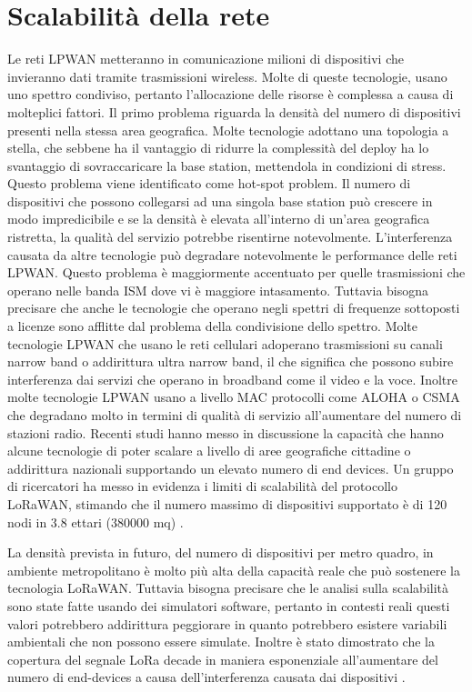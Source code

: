 \documentclass[12pt,a4paper,openright,twoside]{report}
\begin{document}
\section{Scalabilit\`a della rete}
Le reti LPWAN metteranno in comunicazione milioni di dispositivi che invieranno dati tramite trasmissioni wireless. Molte di queste tecnologie, usano uno spettro condiviso, pertanto l'allocazione delle risorse \`e complessa a causa di molteplici fattori. 
Il primo problema riguarda la densit\`a del numero di dispositivi presenti nella stessa area geografica. Molte tecnologie adottano una topologia a stella, che sebbene ha il vantaggio di ridurre la complessit\`a del deploy ha lo svantaggio di sovraccaricare la base station, mettendola in condizioni di stress. 
Questo problema viene identificato come hot-spot problem. Il numero di dispositivi che possono collegarsi ad una singola base station pu\`o crescere in modo impredicibile e se la densit\`a \`e elevata all'interno di un'area geografica ristretta, la qualit\`a del servizio potrebbe risentirne notevolmente.  
L'interferenza causata da altre tecnologie pu\`o degradare notevolmente le performance delle reti LPWAN. Questo problema \`e maggiormente accentuato per quelle trasmissioni che operano nelle banda ISM dove vi \`e maggiore intasamento. 
Tuttavia bisogna precisare che anche le tecnologie che operano negli spettri di frequenze sottoposti a licenze sono afflitte dal problema della condivisione dello spettro.
Molte tecnologie LPWAN che usano le reti cellulari adoperano trasmissioni su canali narrow band o addirittura ultra narrow band, il che significa che possono subire interferenza dai servizi che operano in broadband come il video e la voce. 
Inoltre molte tecnologie LPWAN usano a livello MAC protocolli come ALOHA o CSMA che degradano molto in termini di qualit\`a di servizio all'aumentare del numero di stazioni radio.
Recenti studi hanno messo in discussione la capacit\`a che hanno alcune tecnologie di poter scalare a livello di aree geografiche cittadine o addirittura nazionali supportando un elevato numero di end devices.
Un gruppo di ricercatori ha messo in evidenza i limiti di scalabilità del protocollo LoRaWAN, stimando che il numero massimo di dispositivi supportato è di 120 nodi in 3.8 ettari (380000 mq) \cite{K11}.

La densit\`a prevista in futuro, del numero di dispositivi per metro quadro, in ambiente metropolitano \`e molto pi\`u alta della capacit\`a reale che pu\`o sostenere la tecnologia  LoRaWAN. 
Tuttavia bisogna precisare che le analisi sulla scalabilit\`a sono state fatte usando dei simulatori software, pertanto in contesti reali questi valori potrebbero addirittura peggiorare in quanto potrebbero esistere variabili ambientali che non possono essere simulate.  
Inoltre \`e stato dimostrato che la copertura del segnale LoRa decade in maniera esponenziale all'aumentare del numero di end-devices a causa dell'interferenza causata dai dispositivi \cite{K12}.
\end{document}
